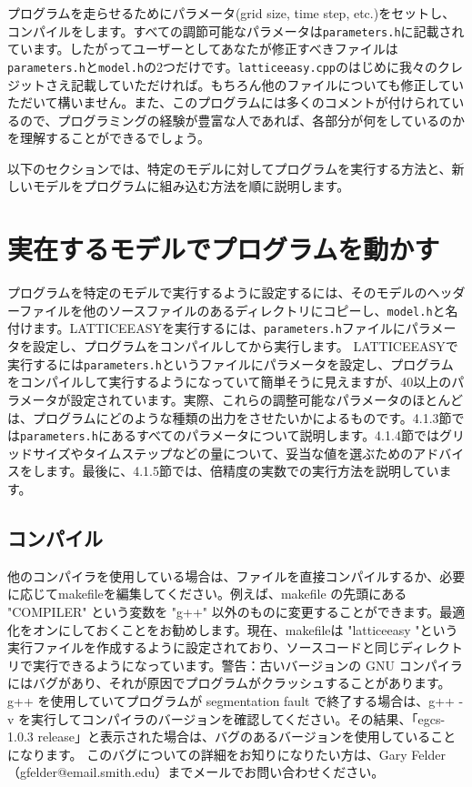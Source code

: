 \documentclass[dvipdfmx,11pt,a4paper,report]{jsbook}
\begin{document}
プログラムを走らせるためにパラメータ(grid size, time step, etc.)をセットし、コンパイルをします。すべての調節可能なパラメータは{\tt parameters.h}に記載されています。したがってユーザーとしてあなたが修正すべきファイルは{\tt parameters.h}と{\tt model.h}の2つだけです。{\tt latticeeasy.cpp}のはじめに我々のクレジットさえ記載していただければ。もちろん他のファイルについても修正していただいて構いません。また、このプログラムには多くのコメントが付けられているので、プログラミングの経験が豊富な人であれば、各部分が何をしているのかを理解することができるでしょう。

以下のセクションでは、特定のモデルに対してプログラムを実行する方法と、新しいモデルをプログラムに組み込む方法を順に説明します。

\section{実在するモデルでプログラムを動かす}
プログラムを特定のモデルで実行するように設定するには、そのモデルのヘッダーファイルを他のソースファイルのあるディレクトリにコピーし、{\tt model.h}と名付けます。LATTICEEASYを実行するには、{\tt parameters.h}ファイルにパラメータを設定し、プログラムをコンパイルしてから実行します。 LATTICEEASYで実行するには{\tt parameters.h}というファイルにパラメータを設定し、プログラムをコンパイルして実行するようになっていて簡単そうに見えますが、40以上のパラメータが設定されています。実際、これらの調整可能なパラメータのほとんどは、プログラムにどのような種類の出力をさせたいかによるものです。4.1.3節では{\tt parameters.h}にあるすべてのパラメータについて説明します。4.1.4節ではグリッドサイズやタイムステップなどの量について、妥当な値を選ぶためのアドバイスをします。最後に、4.1.5節では、倍精度の実数での実行方法を説明しています。

\subsection{コンパイル}
他のコンパイラを使用している場合は、ファイルを直接コンパイルするか、必要に応じてmakefileを編集してください。例えば、makefile の先頭にある "COMPILER" という変数を "g++" 以外のものに変更することができます。最適化をオンにしておくことをお勧めします。現在、makefileは "latticeeasy "という実行ファイルを作成するように設定されており、ソースコードと同じディレクトリで実行できるようになっています。警告：古いバージョンの GNU コンパイラにはバグがあり、それが原因でプログラムがクラッシュすることがあります。g++ を使用していてプログラムが segmentation fault で終了する場合は、g++ -v を実行してコンパイラのバージョンを確認してください。その結果、「egcs-1.0.3 release」と表示された場合は、バグのあるバージョンを使用していることになります。 このバグについての詳細をお知りになりたい方は、Gary Felder（gfelder@email.smith.edu）までメールでお問い合わせください。
\end{document}
